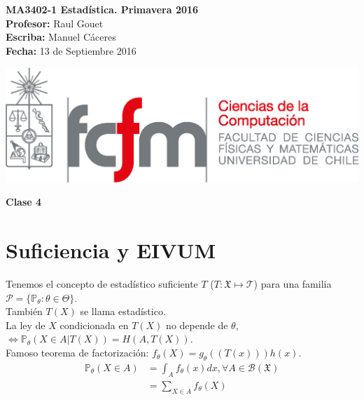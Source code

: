 \documentclass[10pt]{article}
\theoremstyle{plain}
\theoremstyle{definition}
\newcommand{\catnum}{4} %
\newcommand{\fecha}{13 de Septiembre 2016 }
\begin{document}
\vspace*{-1.2 cm}
\begin{minipage}{0.6\textwidth}
\begin{flushleft}
\hspace*{-0.5cm}\textbf{MA3402-1 Estadística. Primavera 2016}\\
\hspace*{-0.5cm}\textbf{Profesor:} Raul Gouet\\
\hspace*{-0.5cm}\textbf{Escriba:} Manuel Cáceres\\
\hspace*{-0.5cm}\textbf{Fecha:} \fecha
\end{flushleft}
\end{minipage}
\begin{minipage}{0.36\textwidth}
\begin{flushright}
\includegraphics[scale=0.3]{imagenes/fcfm_dcc}
\end{flushright}
\end{minipage}
\bigskip

\begin{center}
\LARGE\textbf{Clase \catnum}
\end{center}

\section{Suficiencia y EIVUM}
Tenemos el concepto de estadístico suficiente $T$ ($T\colon \mathfrak{X} \mapsto \mathcal{T}$) para una familia $\mathcal{P}=\{\mathbb{P}_{\theta}\colon \theta \in \Theta\}$.\\
También $T(X)$ se llama estadístico.\\
La ley de $X$ condicionada en $T(X)$ no depende de $\theta$, $\Leftrightarrow \mathbb{P}_{\theta}(X \in A|T(X)) = H(A,T(X))$.\\
Famoso teorema de factorización: $f_{\theta}(X) = g_{\theta}((T(x)))h(x)$.\\
\begin{align*}
\mathbb{P}_{\theta}(X\in A) &= \int_{A}f_{\theta}(x)dx, \forall A \in \mathcal{B}(\mathfrak{X})\\
&= \sum_{X\in A}f_{\theta}(X)
\end{align*}
\end{document}
